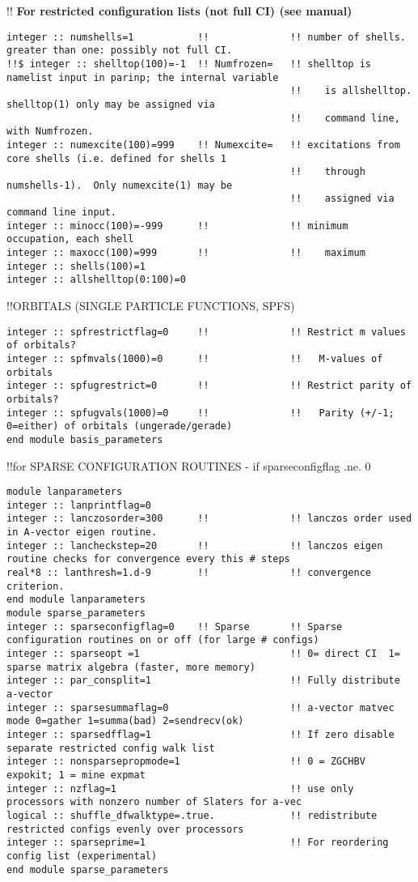 !! \textbf{\qquad For restricted configuration lists (not full CI) (see manual)}
\begin{verbatim}
integer :: numshells=1           !!              !! number of shells.  greater than one: possibly not full CI. 
!!$ integer :: shelltop(100)=-1  !! Numfrozen=   !! shelltop is namelist input in parinp; the internal variable 
                                                 !!    is allshelltop.   shelltop(1) only may be assigned via 
                                                 !!    command line, with Numfrozen.
integer :: numexcite(100)=999    !! Numexcite=   !! excitations from core shells (i.e. defined for shells 1 
                                                 !!    through numshells-1).  Only numexcite(1) may be 
                                                 !!    assigned via command line input.
integer :: minocc(100)=-999      !!              !! minimum occupation, each shell
integer :: maxocc(100)=999       !!              !!    maximum
integer :: shells(100)=1
integer :: allshelltop(0:100)=0           
\end{verbatim}
!!{\large \quad ORBITALS (SINGLE PARTICLE FUNCTIONS, SPFS)}
\begin{verbatim}
integer :: spfrestrictflag=0     !!              !! Restrict m values of orbitals?  
integer :: spfmvals(1000)=0      !!              !!   M-values of orbitals 
integer :: spfugrestrict=0       !!              !! Restrict parity of orbitals? 
integer :: spfugvals(1000)=0     !!              !!   Parity (+/-1; 0=either) of orbitals (ungerade/gerade)
end module basis_parameters
\end{verbatim}
!!{\large \quad for SPARSE CONFIGURATION ROUTINES - if sparseconfigflag .ne. 0}
\begin{verbatim}
module lanparameters
integer :: lanprintflag=0
integer :: lanczosorder=300      !!              !! lanczos order used in A-vector eigen routine.
integer :: lancheckstep=20       !!              !! lanczos eigen routine checks for convergence every this # steps
real*8 :: lanthresh=1.d-9        !!              !! convergence criterion.
end module lanparameters
module sparse_parameters
integer :: sparseconfigflag=0    !! Sparse       !! Sparse configuration routines on or off (for large # configs)
integer :: sparseopt =1                          !! 0= direct CI  1= sparse matrix algebra (faster, more memory)
integer :: par_consplit=1                        !! Fully distribute a-vector
integer :: sparsesummaflag=0                     !! a-vector matvec mode 0=gather 1=summa(bad) 2=sendrecv(ok)
integer :: sparsedfflag=1                        !! If zero disable separate restricted config walk list
integer :: nonsparsepropmode=1                   !! 0 = ZGCHBV expokit; 1 = mine expmat
integer :: nzflag=1                              !! use only processors with nonzero number of Slaters for a-vec
logical :: shuffle_dfwalktype=.true.             !! redistribute restricted configs evenly over processors
integer :: sparseprime=1                         !! For reordering config list (experimental)
end module sparse_parameters
\end{verbatim}
